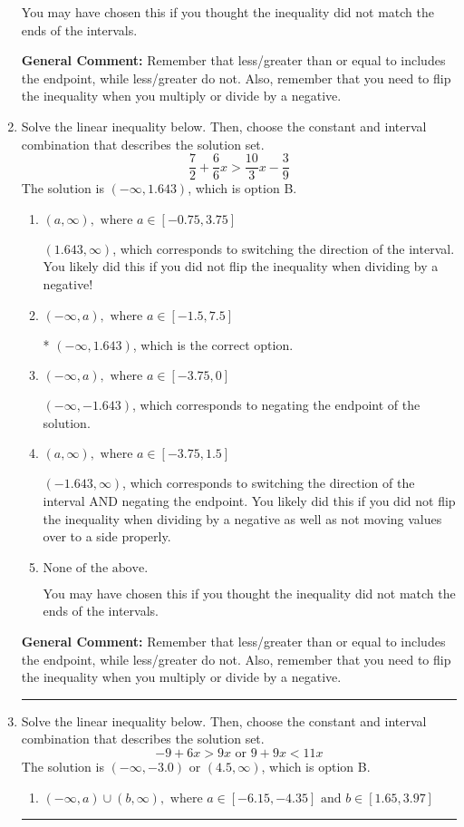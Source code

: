 \documentclass{extbook}[14pt]
\newcommand{\litem}[1]{\item #1

\rule{\textwidth}{0.4pt}}
\begin{document}
\begin{enumerate}
{\begin{enumerate}[label=\Alph*.]
You may have chosen this if you thought the inequality did not match the ends of the intervals.
\end{enumerate}

\textbf{General Comment:} Remember that less/greater than or equal to includes the endpoint, while less/greater do not. Also, remember that you need to flip the inequality when you multiply or divide by a negative.
}
\litem{
Solve the linear inequality below. Then, choose the constant and interval combination that describes the solution set.
\[ \frac{7}{2} + \frac{6}{6} x > \frac{10}{3} x - \frac{3}{9} \]The solution is \( (-\infty, 1.643) \), which is option B.\begin{enumerate}[label=\Alph*.]
\item \( (a, \infty), \text{ where } a \in [-0.75, 3.75] \)

 $(1.643, \infty)$, which corresponds to switching the direction of the interval. You likely did this if you did not flip the inequality when dividing by a negative!
\item \( (-\infty, a), \text{ where } a \in [-1.5, 7.5] \)

* $(-\infty, 1.643)$, which is the correct option.
\item \( (-\infty, a), \text{ where } a \in [-3.75, 0] \)

 $(-\infty, -1.643)$, which corresponds to negating the endpoint of the solution.
\item \( (a, \infty), \text{ where } a \in [-3.75, 1.5] \)

 $(-1.643, \infty)$, which corresponds to switching the direction of the interval AND negating the endpoint. You likely did this if you did not flip the inequality when dividing by a negative as well as not moving values over to a side properly.
\item \( \text{None of the above}. \)

You may have chosen this if you thought the inequality did not match the ends of the intervals.
\end{enumerate}

\textbf{General Comment:} Remember that less/greater than or equal to includes the endpoint, while less/greater do not. Also, remember that you need to flip the inequality when you multiply or divide by a negative.
}
\litem{
Solve the linear inequality below. Then, choose the constant and interval combination that describes the solution set.
\[ -9 + 6 x > 9 x \text{ or } 9 + 9 x < 11 x \]The solution is \( (-\infty, -3.0) \text{ or } (4.5, \infty) \), which is option B.\begin{enumerate}[label=\Alph*.]
\item \( (-\infty, a) \cup (b, \infty), \text{ where } a \in [-6.15, -4.35] \text{ and } b \in [1.65, 3.97] \)


\end{enumerate}}
\end{enumerate}
\end{document}
